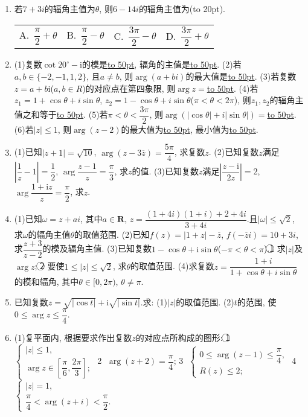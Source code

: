 \documentclass[10pt,a4paper]{article}
\newcommand{\blank}[1]{\underline{\hbox to #1pt{}}}
\newcommand{\bracket}[1]{(\hbox to #1pt{})}
\newcommand{\fourch}[4]{\par\begin{tabular}{p{.23\textwidth}p{.23\textwidth}p{.23\textwidth}p{.23\textwidth}}
A.~#1 &B.~#2& C.~#3& D.~#4
\end{tabular}}
\begin{document}
\begin{enumerate}[1.]
\fourch{$(-\dfrac{\pi }4,\dfrac{\pi }2)$}{$(\dfrac{7\pi }4,2\pi)$}{$[0,\dfrac{\pi }2)$}{$[0,\dfrac{\pi }2)\cup (\dfrac{7\pi }4,2\pi)$}
\item 若$7+3i$的辐角主值为$\theta$, 则$6-14i$的辐角主值为\bracket{20}.
\fourch{$\dfrac{\pi }2+\theta$}{$\dfrac{\pi }2-\theta$}{$\dfrac{3\pi }2-\theta$}{$\dfrac{3\pi }2+\theta$}
\item (1)复数$\cot 20^\circ -\mathrm{i}$的模是\blank{50}, 辐角的主值是\blank{50}.
(2)若$a,b\in \{-2,-1,1,2\}$, 且$a\ne b$, 则$\arg (a+bi)$的最大值是\blank{50}.
(3)若复数$z=a+b\mathrm{i}$($a,b\in R$)的对应点在第四象限, 则$\arg z=$\blank{50}.
(4)若$z_1=1+\cos \theta +i\sin \theta$, $z_2=1-\cos \theta +i\sin \theta$($\pi <\theta <2\pi$), 则$z_1,z_2$的辐角主值之和等于\blank{50}.
(5)若$\pi <\theta <\dfrac{3\pi }2$, 则$\arg (|\cos \theta|+i|\sin \theta|)=$\blank{50}.
(6)若$|z|\le 1$, 则$\arg (z-2)$的最大值为\blank{50}, 最小值为\blank{50}.
\item (1)已知$|z+1|=\sqrt {10}$, $\arg (z-3\overline z)=\dfrac{5\pi }4$, 求复数$z$.
(2)已知复数$z$满足$|\dfrac 1z-1|=\dfrac 12$, $\arg \dfrac{z-1}z=\dfrac{\pi }3$, 求$z$的值.
(3)已知复数$z$满足$|\dfrac{z-\mathrm{i}}{2z}|=2$, $\arg \dfrac{1+\mathrm{i}z}z=\dfrac{\pi }2$, 求$z$.
\item (1)已知$\omega =z+ai$, 其中$a\in \mathbf{R}$, $z=\dfrac{(1+4i)(1+i)+2+4i}{3+4i}$.且$|\omega|\le \sqrt 2$, 求$\omega$的辐角主值$\theta$的取值范围.
(2)已知$f(z)=|1+z|-\overline z$, $f(-\overline zi)=10+3i$, 求$\dfrac{z+3}{z-2}$的模及辐角主值.
(3)已知复数$1-\cos \theta +\mathrm{i}\sin \theta$($-\pi <\theta <\pi$).\textcircled{1} 求$|z|$及$\arg z$; \textcircled{2} 要使$1\le|z|\le \sqrt 2$, 求$\theta$的取值范围.
(4)求复数$z=\dfrac{1+i}{1+\cos \theta +i\sin \theta }$的模和辐角, 其中$\theta \in [0,2\pi)$, $\theta \ne \pi$.
\item 已知复数$z=\sqrt {|\cos t|}+\mathrm{i}\sqrt {|\sin t|}$.求:
(1)$|z|$的取值范围.
(2)$t$的范围, 使$0\le \arg z\le \dfrac{\pi }4$.
\item (1)复平面内, 根据要求作出复数$z$的对应点所构成的图形:
\textcircled{1} $\begin{cases}|z|\le 1, \\ \arg z\in [\dfrac{\pi }6,\dfrac{2\pi }3]; \end{cases}$					\textcircled{2} $\arg (z+2)=\dfrac{\pi }4$;
\textcircled{3} $\begin{cases} 0\le \arg (z-1)\le \dfrac{\pi }4, \\ R(z)\le 2; \end{cases}$				\textcircled{4} $\begin{cases}|z|=1, \\ \dfrac{\pi }4<\arg (z+i)<\dfrac{\pi }2. \end{cases}$

\end{enumerate}
\end{document}
